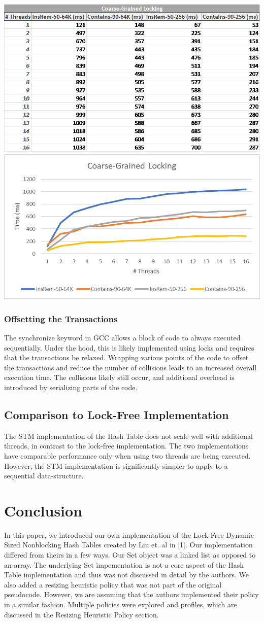 \documentclass[11pt]{article} %
\begin{document}
\bigskip
\includegraphics[width=0.5\linewidth]{Table5.png}
\includegraphics[width=0.5\linewidth]{Graph5.png}

\subsubsection{Offsetting the Transactions}

The synchronize keyword in GCC allows a block of code to always executed sequentially. Under the hood, this is likely implemented using locks and requires that the transactions be relaxed. Wrapping various points of the code to offset the transactions and reduce the number of collisions leads to an increased overall execution time. The collisions likely still occur, and additional overhead is introduced by serializing parts of the code.

\subsection{Comparison to Lock-Free Implementation}

The STM implementation of the Hash Table does not scale well with additional threads, in contrast to the lock-free implementation. The two implementations have comparable performance only when using two threads are being executed. However, the STM implementation is significantly simpler to apply to a sequential data-structure.

\section{Conclusion}

In this paper, we introduced our own implementation of the Lock-Free Dynamic-Sized Nonblocking Hash Tables created by Liu et. al in [1]. Our implementation differed from theirs in a few ways. Our Set object was a linked list as opposed to an array. The underlying Set impementation is not a core aspect of the Hash Table implementation and thus was not discussed in detail by the authors. We also added a resizing heuristic policy that was not part of the original pseudocode. However, we are assuming that the authors implemented their policy in a similar fashion. Multiple policies were explored and profiles, which are discussed in the Resizing Heuristic Policy section.
\end{document}
